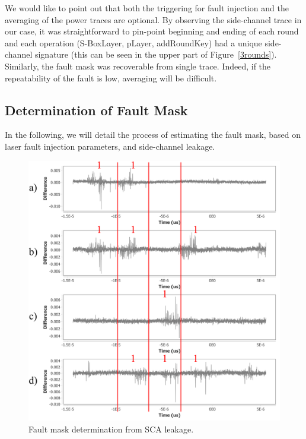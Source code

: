 \documentclass[10pt, conference, compsocconf]{IEEEtran}  %
\numberwithin{Definition}{section}
\numberwithin{Claim}{section}
\begin{document}
We would like to point out that both the triggering for fault injection and the averaging of the power traces are optional. By observing the side-channel trace in our case, it was straightforward to pin-point beginning and ending of each round and each operation (S-BoxLayer, pLayer, addRoundKey) had a unique side-channel signature (this can be seen in the upper part of Figure~\ref{3rounds}). Similarly, the 
fault mask was recoverable from single trace. Indeed, if the repeatability of the fault is low, averaging will be difficult.

\subsection{Determination of Fault Mask}

In the following, we will detail the process of estimating the fault mask, based on laser fault injection parameters, and side-channel leakage.

\begin{figure}
	\centering
	\includegraphics[width=0.8\linewidth]{sca_masks1}
    \caption{Fault mask determination from SCA leakage.}
    \label{sca_masks}
\end{figure}
\end{document}
